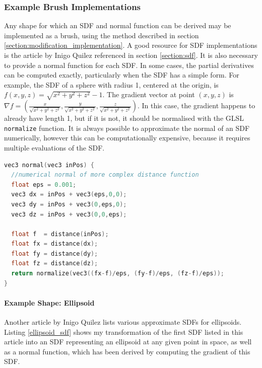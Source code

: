 \documentclass[11pt]{article}
\begin{document}
\subsubsection{Example Brush Implementations}
\label{example_brushes}
Any shape for which an SDF and normal function can be derived may be implemented as a brush, using the method described in section \ref{section:modification_implementation}. A good resource for SDF implementations is the article by Inigo Quilez referenced in section \ref{section:sdf}\cite{quilez:sdf}. It is also necessary to provide a normal function for each SDF. In some cases, the partial derivatives can be computed exactly, particularly when the SDF has a simple form. For example, the SDF of a sphere with radius 1, centered at the origin, is $f\left(x,y,z\right) = \sqrt{x^2+y^2+z^2}-1$. The gradient vector at point $\left(x,y,z\right)$ is $\nabla f = \left(\frac{x}{\sqrt{x^2+y^2+z^2}},\frac{y}{\sqrt{x^2+y^2+z^2}},\frac{z}{\sqrt{x^2+y^2+z^2}}\right)$. In this case, the gradient happens to already have length 1, but if it is not, it should be normalised with the GLSL \texttt{normalize} function. It is always possible to approximate the normal of an SDF numerically, however this can be computationally expensive, because it requires multiple evaluations of the SDF.

\begin{lstlisting}[language=C++,label={numerical_gradient},caption={Approximation of the normal of an SDF, using the method of finite differences.}]
vec3 normal(vec3 inPos) {
  //numerical normal of more complex distance function
  float eps = 0.001;
  vec3 dx = inPos + vec3(eps,0,0);
  vec3 dy = inPos + vec3(0,eps,0);
  vec3 dz = inPos + vec3(0,0,eps);

  float f  = distance(inPos);
  float fx = distance(dx);
  float fy = distance(dy);
  float fz = distance(dz);
  return normalize(vec3((fx-f)/eps, (fy-f)/eps, (fz-f)/eps));
}
\end{lstlisting}

\paragraph{Example Shape: Ellipsoid}
Another article by Inigo Quilez\cite{quilez:ellipsoid} lists various approximate SDFs for ellipsoids. Listing \ref{ellipsoid_sdf} shows my transformation of the first SDF listed in this article into an SDF representing an ellipsoid at any given point in space, as well as a normal function, which has been derived by computing the gradient of this SDF.
\end{document}

